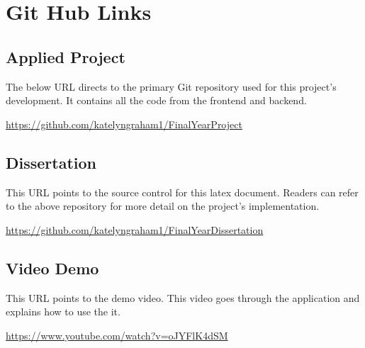 \appendix
\chapter{Git Hub Links}

\section{Applied Project}

The below URL directs to the primary Git repository used for this project’s development. It contains all the code from the frontend and backend.

\href{https://github.com/katelyngraham1/Final_Year_Project}{https://github.com/katelyngraham1/Final\textunderscore Year\textunderscore Project} 


\section{Dissertation} 
This URL points to the source control for this latex document. Readers can refer to the above repository for more detail on the project’s implementation.

\href{https://github.com/katelyngraham1/Final_Year_Dissertation}
{https://github.com/katelyngraham1/Final\textunderscore Year\textunderscore Dissertation}



\section{Video Demo}
This URL points to the demo video. This video goes through the application and explains how to use the it.

\href{https://youtu.be/oJY_FlK4dSM}
{https://www.youtube.com/watch?v=oJY\textunderscore FlK4dSM}
